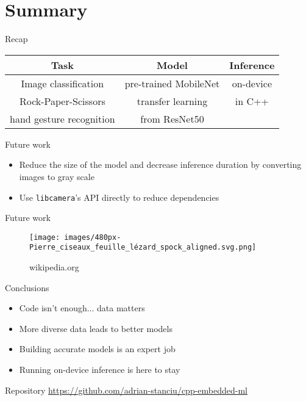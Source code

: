 
\section{Summary}

\begin{frame}{Recap}
  \begin{table}
	\begin{tabular}{|c|c|c|}
	  \hline
		\textbf{Task} & \textbf{Model} & \textbf{Inference} \\
	  \hline
		\multicolumn{1}{|c|}{Image classification} &
		pre-trained MobileNet & on-device \\
	  \cline{1-2}
		\multicolumn{1}{|c|}{Rock-Paper-Scissors} & transfer learning & in C++ \\
		\multicolumn{1}{|c|}{hand gesture recognition} & from ResNet50 & \\
	  \hline
	\end{tabular}
  \end{table}
\end{frame}

\begin{frame}{Future work}
  \begin{itemize}
	\item Reduce the size of the model and decrease inference duration by
	converting images to gray scale
	\item Use \texttt{libcamera}'s API directly to reduce dependencies
  \end{itemize}
\end{frame}

\begin{frame}{Future work}
  \begin{figure}
	\texttt{[image: images/480px-Pierre\_ciseaux\_feuille\_lézard\_spock\_aligned.svg.png]}
	\caption{wikipedia.org}
  \end{figure}
\end{frame}

\begin{frame}{Conclusions}
  \begin{itemize}
	\item Code isn't enough... data matters
	\item More diverse data leads to better models
	\item Building accurate models is an expert job
	\item Running on-device inference is here to stay
  \end{itemize}
\end{frame}

\begin{frame}{Repository}
  \url{https://github.com/adrian-stanciu/cpp-embedded-ml}
\end{frame}

